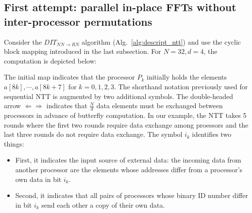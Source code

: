 \documentclass{iacrtrans}
\theoremstyle{plain}
\begin{document}
\subsection{First attempt: parallel in-place FFTs without inter-processor permutations}

Consider the $DIT_{NN\to RN}$ algorithm (Alg.~\ref{alg:descript_ntt}) and use the cyclic block mapping introduced in the last subsection. For $N=32, d=4$, the computation is depicted below:

\begin{table}[h!]\begin{center}
\end{center}\end{table}

The initial map indicates that the processor $P_k$ initially holds the elements $a[8k],\cdots ,a[8k+7]$ for $k=0,1,2,3$.
The shorthand notation previously used for sequential NTT is augmented by two additional symbols. The double-headed arrow $\Longleftarrow\Longrightarrow$ indicates that $\frac{N}{d}$ data elements must be exchanged between processors in advance of butterfly computation. In our example, the NTT takes 5 rounds where the first two rounds require data exchange among proessors and the last three rounds do not require data exchange. The symbol $i_k$ identifies two things:
\begin{itemize}
  \item First, it indicates the input source of external data: the incoming data from another processor are the elements whose addresses differ from a processor's own data in bit $i_k$.
  \item Second, it indicates that all pairs of processors whose binary ID number differ in bit $i_k$ send each other a copy of their own data.
\end{itemize}
\end{document}
